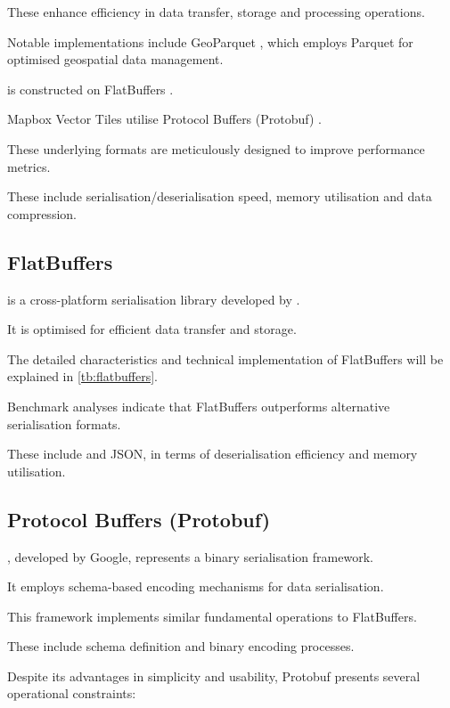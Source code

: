 These enhance efficiency in data transfer, storage and processing operations.

Notable implementations include GeoParquet \citep{geoparquet}, which employs Parquet \citep{parquet} for optimised geospatial data management.

\citet{flatgeobuf} is constructed on FlatBuffers \citep{flatbuffers}.

Mapbox Vector Tiles \citep{mapbox-vector-tiles} utilise Protocol Buffers (Protobuf) \citep{protobuf}.

These underlying formats are meticulously designed to improve performance metrics.

These include serialisation/deserialisation speed, memory utilisation and data compression.

\subsection{FlatBuffers}
\label{rw:non_geospatial_formats:flatbuffers}

\citet{flatbuffers} is a cross-platform serialisation library developed by \citet{google_flatbuffers}.

It is optimised for efficient data transfer and storage.

The detailed characteristics and technical implementation of FlatBuffers will be explained in \autoref{tb:flatbuffers}.

Benchmark analyses \citep{flatbuffers_benchmark} indicate that FlatBuffers outperforms alternative serialisation formats.

These include \citet{protobuf} and JSON, in terms of deserialisation efficiency and memory utilisation.

\subsection{Protocol Buffers (Protobuf)}
\label{rw:non_geospatial_formats:protobuf}

\citet{protobuf}, developed by Google, represents a binary serialisation framework.

It employs schema-based encoding mechanisms for data serialisation.

This framework implements similar fundamental operations to FlatBuffers.

These include schema definition and binary encoding processes.

Despite its advantages in simplicity and usability, Protobuf presents several operational constraints:

